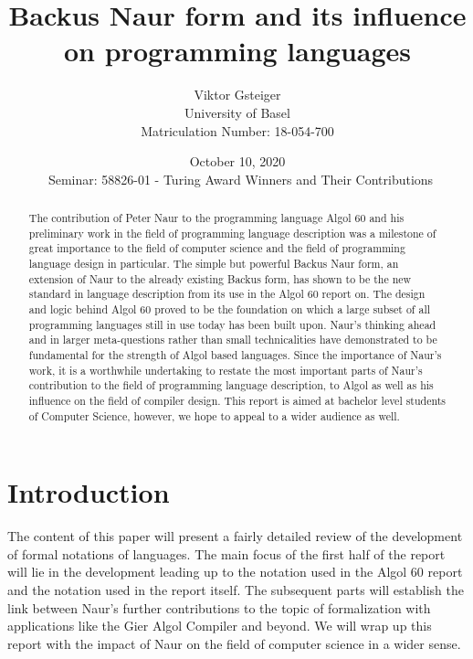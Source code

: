 \documentclass{article}
\author{Viktor Gsteiger \\ University of Basel \\ Matriculation Number: 18-054-700}
\title{Backus Naur form and its influence on programming languages}
\date{October 10, 2020 \\\ Seminar: 58826-01 - Turing Award Winners and Their Contributions}
\begin{document}
\maketitle

\begin{abstract}
	The contribution of Peter Naur to the programming language Algol 60 and his preliminary work in the field of programming language description was a milestone of great importance to the field of computer science and the field of programming language design in particular. The simple but powerful Backus Naur form, an extension of Naur to the already existing Backus form, has shown to be the new standard in language description from its use in the Algol 60 report on. The design and logic behind Algol 60 proved to be the foundation on which a large subset of all programming languages still in use today has been built upon. Naur’s thinking ahead and in larger meta-questions rather than small technicalities have demonstrated to be fundamental for the strength of Algol based languages. Since the importance of Naur’s work, it is a worthwhile undertaking to restate the most important parts of Naur’s contribution to the field of programming language description, to Algol as well as his influence on the field of compiler design. This report is aimed at bachelor level students of Computer Science, however, we hope to appeal to a wider audience as well.
\end{abstract}

\newpage

\section{Introduction}
The content of this paper will present a fairly detailed review of the development of formal notations of languages. The main focus of the first half of the report will lie in the development leading up to the notation used in the Algol 60 report and the notation used in the report itself. The subsequent parts will establish the link between Naur's further contributions to the topic of formalization with applications like the Gier Algol Compiler and beyond. We will wrap up this report with the impact of Naur on the field of computer science in a wider sense.
\end{document}
